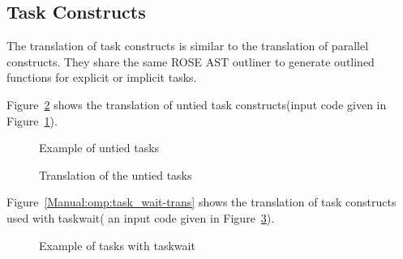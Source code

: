 \clearpage
\subsection{Task Constructs}
The translation of task constructs is similar to the translation of parallel constructs. 
They share the same ROSE AST outliner to generate outlined functions for
explicit or implicit tasks.

Figure~\ref{Manual:omp:task_untied3-trans} shows the translation of untied task constructs(input code given in
Figure~\ref{Manual:omp:task_untied3}). 

\lstset{language=C,basicstyle=\scriptsize}
\begin{figure}[htbp]
{\indent
  {\mySmallFontSize
    \begin{latexonly}
    
    \end{latexonly}
    \begin{htmlonly}
    
    \end{htmlonly}
  }
}
\caption{Example of untied tasks}
\label{Manual:omp:task_untied3}
\end{figure}

\begin{figure}[htbp]
{\indent
  {\mySmallFontSize
    \begin{latexonly}
    
    \end{latexonly}
    \begin{htmlonly}
    
    \end{htmlonly}
  }
}
\caption{Translation of the untied tasks}
\label{Manual:omp:task_untied3-trans}
\end{figure}

Figure~\ref{Manual:omp:task_wait-trans} shows the translation of task constructs used with taskwait( an input code given in
Figure~\ref{Manual:omp:task_wait}). 

\lstset{language=C,basicstyle=\scriptsize}
\begin{figure}[htbp]
{\indent
  {\mySmallFontSize
    \begin{latexonly}
    
    \end{latexonly}
    \begin{htmlonly}
    
    \end{htmlonly}
  }
}
\caption{Example of tasks with taskwait}
\label{Manual:omp:task_wait}
\end{figure}

